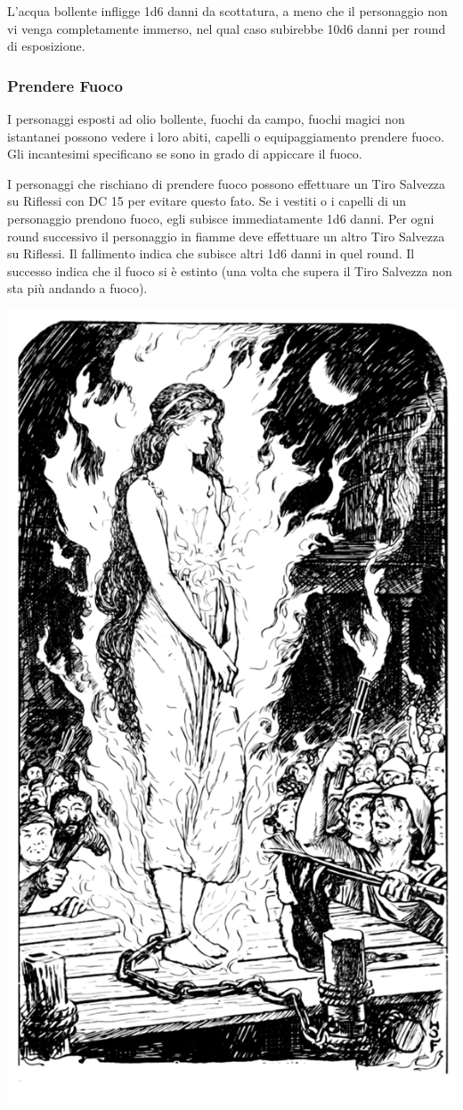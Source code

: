 \begin{multicols}{2}
L'acqua bollente infligge 1d6 danni da scottatura, a meno che il personaggio non vi venga completamente immerso, nel qual caso subirebbe 10d6 danni per round di esposizione.

\subsubsection{Prendere Fuoco}

\label{prendere-fuoco}

I personaggi esposti ad olio bollente, fuochi da campo, fuochi magici non istantanei possono vedere i loro abiti, capelli o equipaggiamento prendere fuoco. Gli incantesimi specificano se sono in grado di appiccare il fuoco.

I personaggi che rischiano di prendere fuoco possono effettuare un Tiro Salvezza su Riflessi con DC 15 per evitare questo fato. Se i vestiti o i capelli di un personaggio prendono fuoco, egli subisce immediatamente 1d6 danni. Per ogni round successivo il personaggio in fiamme deve effettuare un altro Tiro Salvezza su Riflessi. Il fallimento indica che subisce altri 1d6 danni in quel round. Il successo indica che il fuoco si è estinto (una volta che supera il Tiro Salvezza non sta più andando a fuoco).

\begin{center}
	\includegraphics[width=0.7\linewidth]{immagini/fuocopericolo.png}
\end{center}


\end{multicols}
